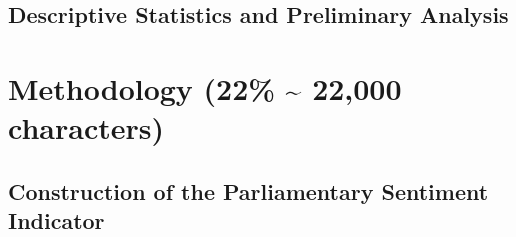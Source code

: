 \documentclass[12pt]{scrartcl}
\numberwithin{equation}{section}				%
\begin{document}
    \subsection{Descriptive Statistics and Preliminary Analysis}
    
    \section{Methodology (22\% \; \textasciitilde{} 22,000 characters)}
    
    \subsection{Construction of the Parliamentary Sentiment Indicator}
    
    
    
\end{document}
